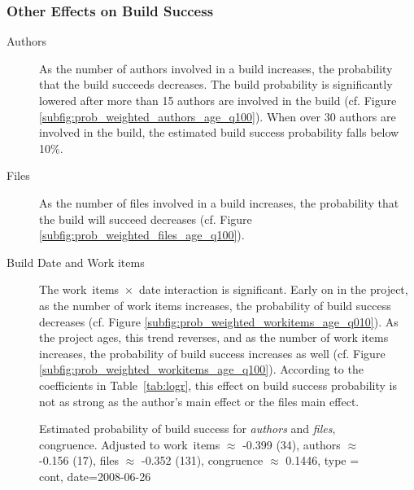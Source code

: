 \subsubsection{Other Effects on Build Success}
\label{sec:effectauthors}
\begin{description}
\item[Authors] As the number of authors involved in a build increases, the probability that the build succeeds decreases. The build probability is significantly lowered after more than 15 authors are involved in the build (cf. Figure \ref{subfig:prob_weighted_authors_age_q100}). When over 30 authors are involved in the build, the estimated build success probability falls below 10\%.

\item[Files] As the number of files involved in a build increases, the probability that the build will succeed decreases (cf. Figure \ref{subfig:prob_weighted_files_age_q100}).

\item[Build Date and Work items] The work~items~$\times$~date interaction is significant. Early on in the project, as the number of work items increases, the probability of build success decreases (cf. Figure \ref{subfig:prob_weighted_workitems_age_q010}). As the project ages, this trend reverses, and as the number of work items increases, the probability of build success increases as well (cf. Figure \ref{subfig:prob_weighted_workitems_age_q100}). According to the coefficients in Table~\ref{tab:logr}, this effect on build success probability is not as strong as the author's main effect or the files main effect.
\end{description}

\begin{figure}[t]
\centering
{}

\caption{Estimated probability of build success for \emph{authors} and \emph{files},  congruence. Adjusted to work~items $\approx$ -0.399 (34), authors $\approx$ -0.156 (17), files $\approx$ -0.352 (131), congruence $\approx$ 0.1446, type = cont, date=2008-06-26}
  \label{fig:weighted_congruence_authors_age}
\end{figure}




